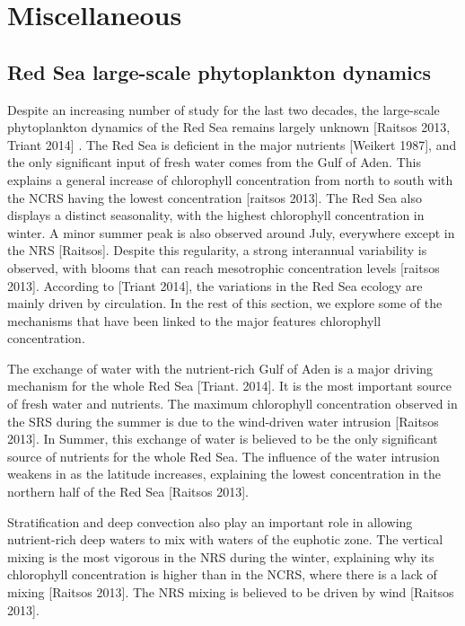 \chapter{Miscellaneous}
\label{chapter4}

\section{Red Sea large-scale phytoplankton dynamics}

Despite an increasing number of study for the last two decades, the large-scale phytoplankton dynamics of the Red Sea remains largely unknown [Raitsos 2013, Triant 2014] \cite{Raitsos2013}. The Red Sea is deficient in the major nutrients [Weikert 1987], and the only significant input of fresh water comes from the Gulf of Aden. This explains a general increase of chlorophyll concentration from north to south with the NCRS having the lowest concentration [raitsos 2013]. The Red Sea also displays a distinct seasonality, with the highest chlorophyll concentration in winter. A minor summer peak is also observed around July, everywhere except in the NRS [Raitsos]. Despite this regularity, a strong interannual variability is observed, with blooms that can reach mesotrophic concentration levels [raitsos 2013]. According to [Triant 2014], the variations in the Red Sea ecology are mainly driven by circulation. In the rest of this section, we explore some of the mechanisms that have been linked to the major features chlorophyll concentration.

The exchange of water with the nutrient-rich Gulf of Aden is a major driving mechanism for the whole Red Sea [Triant. 2014]. It is the most important source of fresh water and nutrients. The maximum chlorophyll concentration observed in the SRS during the summer is due to the wind-driven water intrusion [Raitsos 2013]. In Summer, this exchange of water is believed to be the only significant source of nutrients for the whole Red Sea. The influence of the water intrusion weakens in as the latitude increases, explaining the lowest concentration in the northern half of the Red Sea [Raitsos 2013].

Stratification and deep convection also play an important role in allowing nutrient-rich deep waters to mix with waters of the euphotic zone. The vertical mixing is the most vigorous in the NRS during the winter, explaining why its chlorophyll concentration is higher than in the NCRS, where there is a lack of mixing [Raitsos 2013]. The NRS mixing is believed to be driven by wind [Raitsos 2013].


